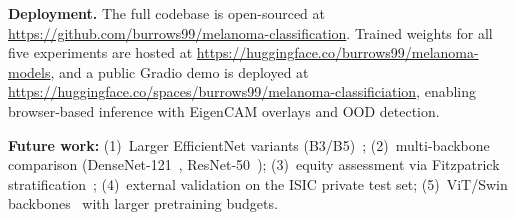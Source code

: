 \documentclass[conference]{IEEEtran}
\begin{document}
\smallskip\noindent\textbf{Deployment.}
The full codebase is open-sourced at
\url{https://github.com/burrows99/melanoma-classification}.
Trained weights for all five experiments are hosted at
\url{https://huggingface.co/burrows99/melanoma-models}, and a public Gradio
demo is deployed at \url{https://huggingface.co/spaces/burrows99/melanoma-classificiation},
enabling browser-based inference with EigenCAM overlays and OOD detection.

\smallskip\noindent\textbf{Future work:}
(1)~Larger EfficientNet variants (B3/B5)~\cite{b7};
(2)~multi-backbone comparison (DenseNet-121~\cite{b9}, ResNet-50~\cite{b10});
(3)~equity assessment via Fitzpatrick stratification~\cite{b13};
(4)~external validation on the ISIC private test set;
(5)~ViT/Swin backbones~\cite{b17,b18} with larger pretraining budgets.
\end{document}

